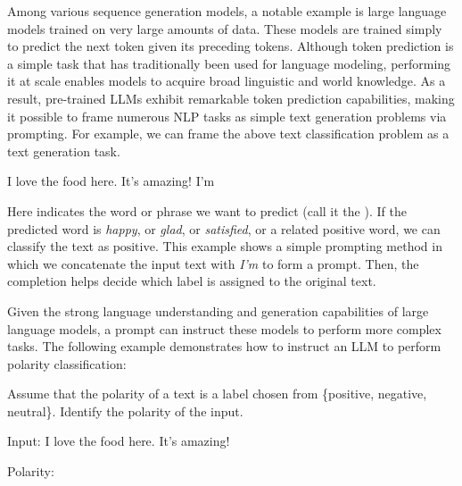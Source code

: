 Among various sequence generation models, a notable example is large language models trained on very large amounts of data. These models are trained simply to predict the next token given its preceding tokens. Although token prediction is a simple task that has traditionally been used for language modeling, performing it at scale enables models to acquire broad linguistic and world knowledge. As a result, pre-trained LLMs exhibit remarkable token prediction capabilities, making it possible to frame numerous NLP tasks as simple text generation problems via prompting. For example, we can frame the above text classification problem as a text generation task.

\begin{center}
\vspace{0.5em}
I love the food here. It's amazing! I'm \underline{\hspace{3em}}
\vspace{0.5em}
\end{center}

\noindent Here \underline{\hspace{1em}} indicates the word or phrase we want to predict (call it the ). If the predicted word is \textit{happy}, or \textit{glad}, or \textit{satisfied}, or a related positive word, we can classify the text as $\mathrm{positive}$. This example shows a simple prompting method in which we concatenate the input text with \textit{I'm} to form a prompt. Then, the completion helps decide which label is assigned to the original text.

Given the strong language understanding and generation capabilities of large language models, a prompt can instruct these models to perform more complex tasks. The following example demonstrates how to instruct an LLM to perform polarity classification:

\vspace{0.5em}
\begin{tcolorbox}

\begingroup
\setlength{\leftskip}{2em}
\setlength{\rightskip}{2em}

Assume that the polarity of a text is a label chosen from \{positive, negative, neutral\}. Identify the polarity of the input.

\vspace{0.2cm}

{\color{blue} Input}: I love the food here. It's amazing!

\vspace{0.2cm}

{\color{red} Polarity}: \underline{\hspace{3em}}

\endgroup

\end{tcolorbox}
\vspace{0.5em}

